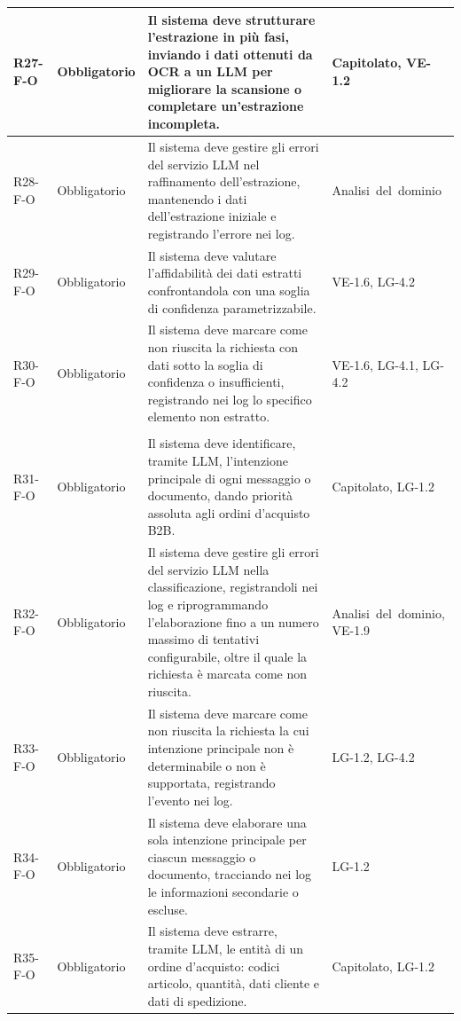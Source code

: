 {\begin{longtable}{|>{\raggedright\arraybackslash}p{1.8cm}|>{\raggedright\arraybackslash}p{2.3cm}|>{\raggedright\arraybackslash}p{6.6cm}|>{\raggedright\arraybackslash}p{3.1cm}|}
    \mbox{R27-F-O} & Obbligatorio & Il sistema deve strutturare l'estrazione in più fasi, inviando i dati ottenuti da OCR a un LLM per migliorare la scansione o completare un'estrazione incompleta. & \mbox{Capitolato}, \mbox{VE-1.2} \\ \hline
    \mbox{R28-F-O} & Obbligatorio & Il sistema deve gestire gli errori del servizio LLM nel raffinamento dell'estrazione, mantenendo i dati dell'estrazione iniziale e registrando l'errore nei log. & \mbox{Analisi del dominio} \\ \hline
    \mbox{R29-F-O} & Obbligatorio & Il sistema deve valutare l'affidabilità dei dati estratti confrontandola con una soglia di confidenza parametrizzabile. & \mbox{VE-1.6}, \mbox{LG-4.2} \\ \hline
    \mbox{R30-F-O} & Obbligatorio & Il sistema deve marcare come non riuscita la richiesta con dati sotto la soglia di confidenza o insufficienti, registrando nei log lo specifico elemento non estratto. & \mbox{VE-1.6}, \mbox{LG-4.1}, \mbox{LG-4.2} \\ \hline
    \multicolumn{4}{|l|}{\cellcolor[gray]{0.94}\textbf{Macroarea 4 --- Elaborazione semantica e strutturazione}} \\ \hline
    \mbox{R31-F-O} & Obbligatorio & Il sistema deve identificare, tramite LLM, l'intenzione principale di ogni messaggio o documento, dando priorità assoluta agli ordini d'acquisto B2B. & \mbox{Capitolato}, \mbox{LG-1.2} \\ \hline
    \mbox{R32-F-O} & Obbligatorio & Il sistema deve gestire gli errori del servizio LLM nella classificazione, registrandoli nei log e riprogrammando l'elaborazione fino a un numero massimo di tentativi configurabile, oltre il quale la richiesta è marcata come non riuscita. & \mbox{Analisi del dominio}, \mbox{VE-1.9} \\ \hline
    \mbox{R33-F-O} & Obbligatorio & Il sistema deve marcare come non riuscita la richiesta la cui intenzione principale non è determinabile o non è supportata, registrando l'evento nei log. & \mbox{LG-1.2}, \mbox{LG-4.2} \\ \hline
    \mbox{R34-F-O} & Obbligatorio & Il sistema deve elaborare una sola intenzione principale per ciascun messaggio o documento, tracciando nei log le informazioni secondarie o escluse. & \mbox{LG-1.2} \\ \hline
    \mbox{R35-F-O} & Obbligatorio & Il sistema deve estrarre, tramite LLM, le entità di un ordine d'acquisto: codici articolo, quantità, dati cliente e dati di spedizione. & \mbox{Capitolato}, \mbox{LG-1.2} \\ \hline

\end{longtable}}
